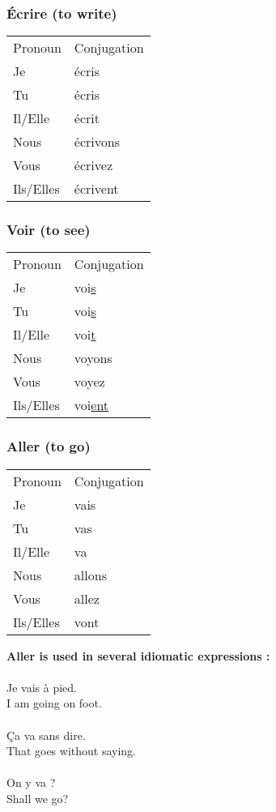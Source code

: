 \subsubsection{\'Ecrire (to write)}
\begin{tabular}{| l | l |}
\hline
Pronoun 	& 	Conjugation	\\
Je		&	\'ecris		\\
Tu		&	\'ecris		\\
Il/Elle		&	\'ecrit		\\
Nous		&	\'ecrivons	\\
Vous		&	\'ecrivez	\\
Ils/Elles	&	\'ecrivent	\\
\hline
\end{tabular}


\subsubsection{Voir (to see)}
\begin{tabular}{| l | l |}
\hline
Pronoun 	& 	Conjugation	\\
Je		    &	voi\ul{s}	\\
Tu		    &	voi\ul{s}	\\
Il/Elle		&	voi\ul{t}	\\
Nous		&	voyons		\\
Vous		&	voyez		\\
Ils/Elles	&	voi\ul{ent}	\\
\hline
\end{tabular}

\subsubsection{Aller (to go)}
\begin{tabular}{| l | l |}
\hline
Pronoun 	& 	Conjugation	\\
Je		    &	vais		\\
Tu		    &	vas		\\
Il/Elle		&	va		\\
Nous		&	allons		\\
Vous		&	allez		\\
Ils/Elles	&	vont		\\
\hline
\end{tabular}

\vspace{0.2in}
\noindent \textbf{Aller is used in several idiomatic expressions :}\\\\
Je vais \`{a} pied.\\
I am going on foot.\\\\
\c{C}a va sans dire.\\
That goes without saying.\\\\
On y va ?\\
Shall we go?

